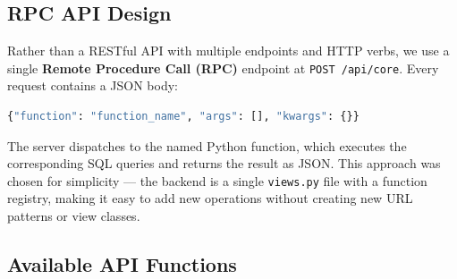 \documentclass[11pt]{article}
\begin{document}
\begin{center}
\end{center}

\subsection{RPC API Design}

Rather than a RESTful API with multiple endpoints and HTTP verbs, we use a single \textbf{Remote Procedure Call (RPC)} endpoint at \texttt{POST /api/core}. Every request contains a JSON body:

\begin{lstlisting}[language=Python]
{"function": "function_name", "args": [], "kwargs": {}}
\end{lstlisting}

The server dispatches to the named Python function, which executes the corresponding SQL queries and returns the result as JSON. This approach was chosen for simplicity --- the backend is a single \texttt{views.py} file with a function registry, making it easy to add new operations without creating new URL patterns or view classes.

\subsection{Available API Functions}
\end{document}
